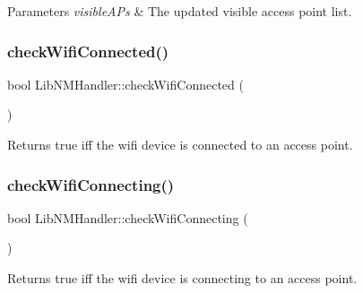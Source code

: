 \begin{DoxyParams}{Parameters}
{\em visible\+A\+Ps} & The updated visible access point list. \\
\hline
\end{DoxyParams}
\mbox{\label{classLibNMHandler_a08bf31efbab3b2abbf7ddfa719a525bc}} 
\subsubsection{\texorpdfstring{check\+Wifi\+Connected()}{checkWifiConnected()}}
{\footnotesize\ttfamily bool Lib\+N\+M\+Handler\+::check\+Wifi\+Connected (\begin{DoxyParamCaption}{ }\end{DoxyParamCaption})\hspace{0.3cm}{\ttfamily [protected]}}

\begin{DoxyReturn}{Returns}
true iff the wifi device is connected to an access point. 
\end{DoxyReturn}
\mbox{\label{classLibNMHandler_afa324173fea0cba03e9558adb308187a}} 
\subsubsection{\texorpdfstring{check\+Wifi\+Connecting()}{checkWifiConnecting()}}
{\footnotesize\ttfamily bool Lib\+N\+M\+Handler\+::check\+Wifi\+Connecting (\begin{DoxyParamCaption}{ }\end{DoxyParamCaption})\hspace{0.3cm}{\ttfamily [protected]}}

\begin{DoxyReturn}{Returns}
true iff the wifi device is connecting to an access point. 
\end{DoxyReturn}
\mbox{\label{classLibNMHandler_a469573619b34a6882623311ecd484299}} 
